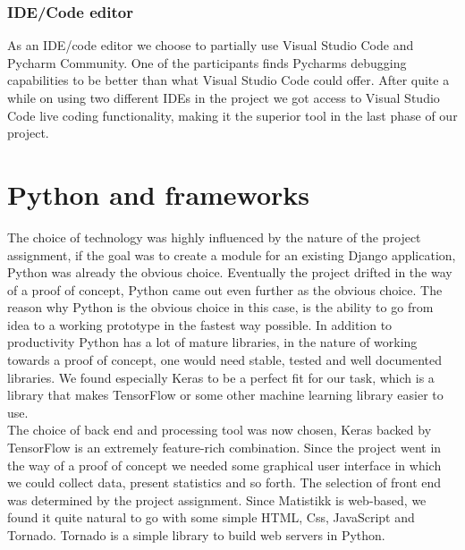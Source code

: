 \subsubsection{IDE/Code editor}
As an IDE/code editor we choose to partially use Visual Studio Code and Pycharm Community. One of the participants finds Pycharms debugging capabilities to be better than what Visual Studio Code could offer. After quite a while on using two different IDEs in the project we got access to Visual Studio Code live coding functionality, making it the superior tool in the last phase of our project.

\section{Python and frameworks}
The choice of technology was highly influenced by the nature of the project assignment, if the goal was to create a module for an existing Django application, Python was already the obvious choice. Eventually the project drifted in the way of a proof of concept, Python came out even further as the obvious choice. The reason why Python is the obvious choice in this case, is the ability to go from idea to a working prototype in the fastest way possible. In addition to productivity Python has a lot of mature libraries, in the nature of working towards a proof of concept, one would need stable, tested and well documented libraries. We found especially Keras \parencite{chollet_keras_2015} to be a perfect fit for our task, which is a library that makes TensorFlow or some other machine learning library easier to use.\\
\quad
The choice of back end and processing tool was now chosen, Keras backed by TensorFlow is an extremely feature-rich combination. Since the project went in the way of a proof of concept we needed some graphical user interface in which we could collect data, present statistics and so forth. The selection of front end was determined by the project assignment. Since Matistikk is web-based, we found it quite natural to go with some simple HTML, Css, JavaScript and Tornado. Tornado is a simple library to build web servers in Python.

